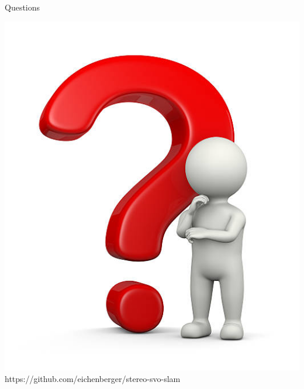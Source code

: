 \documentclass[aspectratio=169,12pt]{beamer}
\begin{document}
\begin{frame}{Questions}
  \begin{center}
    \includegraphics[height=0.7\textheight]{./img/question.jpg}
    https://github.com/eichenberger/stereo-svo-slam
  \end{center}
\end{frame}
\end{document}
